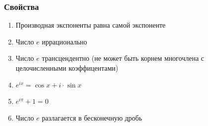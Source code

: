 \documentclass[12pt, fleqn]{extarticle}
\begin{document}
\subsubsection*{Свойства}
\begin{enumerate}
    \item {Производная экспоненты равна самой экспоненте}
    \item {Число \(e\) иррационально}
    \item {Число \(e\) трансцендентно (не может быть корнем многочлена с целочисленными коэффицентами)}
    \item {\(e^{ix} = \cos{x} + i \cdot \sin{x}\)}
    \item {\(e^{i\pi} + 1 = 0\)}
    \item {Число \(e\) разлагается в бесконечную дробь}
\end{enumerate}
\end{document}
